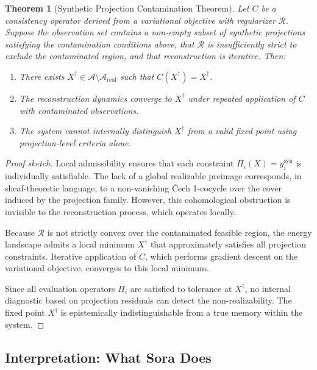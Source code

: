 \documentclass[12pt, letterpaper]{article}
\theoremstyle{flyxion}
\newtheorem{theorem}{Theorem}
\begin{document}
\begin{theorem}[Synthetic Projection Contamination Theorem]
Let $C$ be a consistency operator derived from a variational objective with regularizer $\mathcal{R}$. Suppose the observation set contains a non-empty subset of synthetic projections satisfying the contamination conditions above, that $\mathcal{R}$ is insufficiently strict to exclude the contaminated region, and that reconstruction is iterative. Then:
\begin{enumerate}
\item There exists $X^\dagger \in \mathcal{A} \setminus \mathcal{A}_\mathrm{real}$ such that $C(X^\dagger) = X^\dagger$.
\item The reconstruction dynamics converge to $X^\dagger$ under repeated application of $C$ with contaminated observations.
\item The system cannot internally distinguish $X^\dagger$ from a valid fixed point using projection-level criteria alone.
\end{enumerate}
\end{theorem}

\begin{proof}[Proof sketch]
Local admissibility ensures that each constraint $\Pi_i(X) = y_i^\mathrm{syn}$ is individually satisfiable. The lack of a global realizable preimage corresponds, in sheaf-theoretic language, to a non-vanishing \v{C}ech 1-cocycle over the cover induced by the projection family. However, this cohomological obstruction is invisible to the reconstruction process, which operates locally.

Because $\mathcal{R}$ is not strictly convex over the contaminated feasible region, the energy landscape admits a local minimum $X^\dagger$ that approximately satisfies all projection constraints. Iterative application of $C$, which performs gradient descent on the variational objective, converges to this local minimum.

Since all evaluation operators $\Pi_i$ are satisfied to tolerance at $X^\dagger$, no internal diagnostic based on projection residuals can detect the non-realizability. The fixed point $X^\dagger$ is epistemically indistinguishable from a true memory within the system.
\end{proof}

\subsection{Interpretation: What Sora Does}
\end{document}
